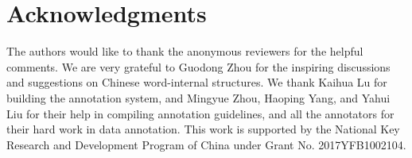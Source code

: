 \section*{Acknowledgments}
The authors would like to thank the anonymous reviewers for the helpful comments.
We are very grateful to Guodong Zhou for the inspiring discussions and suggestions on Chinese word-internal structures.
We thank Kaihua Lu for building
the annotation system, and Mingyue Zhou, Haoping Yang, and Yahui Liu for their help in compiling annotation guidelines, and all the annotators for their hard work in data annotation. This work is supported by the National Key Research and Development Program of China under Grant No. 2017YFB1002104.


